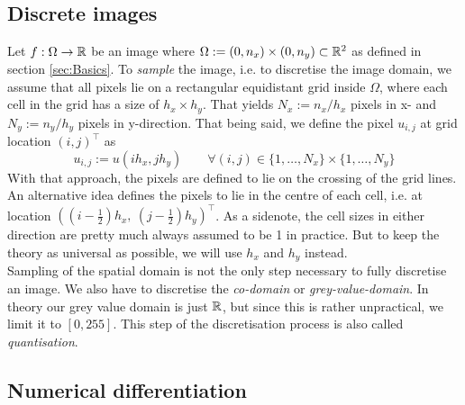 \subsection{Discrete images}
Let $f:\Omega \rightarrow \mathbb{R}$ be an image where $\Omega
:= (0, n_x)\times(0, n_y) \subset \mathbb{R}^2$ as defined in section \ref{sec:Basics}. To
\textit{sample} the image, i.e. to discretise the image domain, we assume that all pixels lie on a
rectangular equidistant grid inside $\Omega$, where each cell in the grid has a size of $h_x
\times h_y$.
That yields $N_x := n_x/h_x$ pixels in x- and $N_y := n_y/h_y$ pixels in
y-direction.
That being said, we define the pixel $u_{i,j}$ at grid location $(i, j)^\top$ as
\begin{equation}
    u_{i, j} := u(ih_x, jh_y)\qquad \forall(i ,j) \in \{1,\dots,N_x\}\times\{1,\dots,N_y\}
\end{equation}
With that approach, the pixels are defined to lie on the crossing of the grid lines.
An alternative idea defines the pixels to lie in the centre of each cell, i.e. at location 
$((i-\frac{1}{2})h_x,\ (j- \frac{1}{2})h_y)^\top$.
As a sidenote, the cell sizes in either direction are pretty much always assumed to be 1 in 
practice. 
But to keep the theory as universal as possible, we will use $h_x$ and $h_y$ instead.\\
Sampling of the spatial domain is not the only step necessary to fully discretise an image. We also have
to discretise the \textit{co-domain} or \textit{grey-value-domain}. In theory our grey value domain
is just $\mathbb{R}$, but since this is rather unpractical, we limit it to $[0, 255]$. This step of
the discretisation process is also called \textit{quantisation}.

\subsection{Numerical differentiation}

